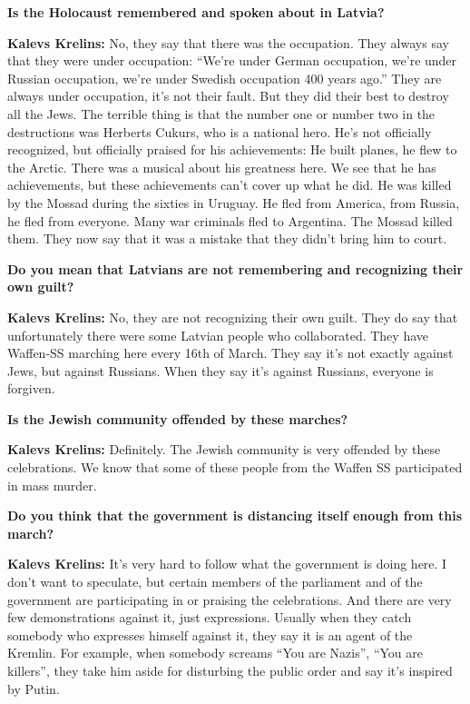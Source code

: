 \textbf{Is the Holocaust remembered and spoken about in Latvia?} 

\textbf{Kalevs Krelins:} No, they say that there was the occupation. They always say that they were under occupation: ``We’re under German occupation, we’re under Russian occupation, we’re under Swedish occupation 400 years ago.'' They are always under occupation, it's not their fault. But they did their best to destroy all the Jews. The terrible thing is that the number one or number two in the destructions was Herberts Cukurs, who is a national hero. He's not officially recognized, but officially praised for his achievements: He built planes, he flew to the Arctic. There was a musical about his greatness here. We see that he has achievements, but these achievements can’t cover up what he did. He was killed by the Mossad during the sixties in Uruguay. He fled from America, from Russia, he fled from everyone. Many war criminals fled to Argentina. The Mossad killed them. They now say that it was a mistake that they didn't bring him to court. 

\textbf{Do you mean that Latvians are not remembering and recognizing their own guilt?} 

\textbf{Kalevs Krelins:} No, they are not recognizing their own guilt. They do say that unfortunately there were some Latvian people who collaborated. They have Waffen-SS marching here every 16th of March. They say it's not exactly against Jews, but against Russians. When they say it's against Russians, everyone is forgiven. 

\textbf{Is the Jewish community offended by these marches?}   

\textbf{Kalevs Krelins:} Definitely. The Jewish community is very offended by these celebrations. We know that some of these people from the Waffen SS participated in mass murder.   

\textbf{Do you think that the government is distancing itself enough from this march?}  

\textbf{Kalevs Krelins:} It’s very hard to follow what the government is doing here. I don’t want to speculate, but certain members of the parliament and of the government are participating in or praising the celebrations. And there are very few demonstrations against it, just expressions. Usually when they catch somebody who expresses himself against it, they say it is an agent of the Kremlin.  For example, when somebody screams ``You are Nazis'', ``You are killers'', they take him aside for disturbing the public order and say it’s inspired by Putin.  

